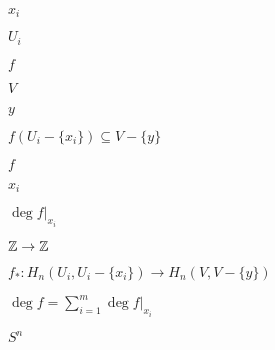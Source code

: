 \documentclass[10pt]{book}
\begin{document}
\begin{mdSnippets}
\begin{mdInlineSnippet}
$x_i$\end{mdInlineSnippet}%
\begin{mdInlineSnippet}[2613ee0449498d55793453205b97e8b8]%
$U_i$\end{mdInlineSnippet}%
\begin{mdInlineSnippet}%
$f$\end{mdInlineSnippet}%
\begin{mdInlineSnippet}[5206560a306a2e085a437fd258eb57ce]%
$V$\end{mdInlineSnippet}%
\begin{mdInlineSnippet}[415290769594460e2e485922904f345d]%
$y$\end{mdInlineSnippet}%
\begin{mdInlineSnippet}[83253edf52be1a36a2769f5bf8b270be]%
$f(U_i - \{x_i\}) \subseteq V - \{y\}$\end{mdInlineSnippet}%
\begin{mdInlineSnippet}%
$f$\end{mdInlineSnippet}%
\begin{mdInlineSnippet}%
$x_i$\end{mdInlineSnippet}%
\begin{mdInlineSnippet}[fe713916cb7b43b1839bda7e8b2b97b6]%
$\deg f |_{x_i}$\end{mdInlineSnippet}%
\begin{mdInlineSnippet}%
$\mathbb{Z} \to \mathbb{Z}$\end{mdInlineSnippet}%
\begin{mdInlineSnippet}[1e40d907f654e48d0e32e2b23f197aac]%
$f_*: H_n(U_i, U_i - \{x_i\}) \to H_n(V, V - \{y\})$\end{mdInlineSnippet}%
\begin{mdInlineSnippet}[e66871016daad214cd9fe0d5bb26ec20]%
$\deg f = \sum_{i=1}^m \deg f |_{x_i}$\end{mdInlineSnippet}%
\begin{mdInlineSnippet}[f74115260830faf5178589e98c061a4e]%
$S^n$\end{mdInlineSnippet}%
\begin{mdInlineSnippet}[e6373ba6940df286edfac5039a9a45db]%

\end{mdInlineSnippet}
\end{mdSnippets}
\end{document}

